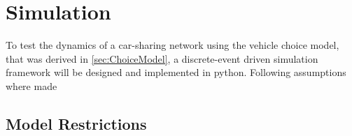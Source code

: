 \clearpage
\section{Simulation}
\label{sec:Simulation}

To test the dynamics of a car-sharing network using the vehicle choice model, that was derived in \ref{sec:ChoiceModel},
a discrete-event driven simulation framework will be designed and implemented in python. Following assumptions where
made

\subsection{Model Restrictions}
\label{subsec:Simulation/restrictions}
